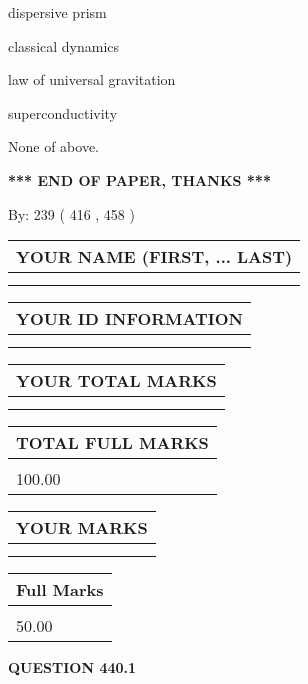 \documentclass[12pt]{article}
\begin{document}
 
dispersive prism
 
 
classical dynamics
 
 
law of universal gravitation
 
 
superconductivity
 
 
 None of above.
 
 
   
   
\vspace{1.0in} 
{\textbf{\large{ *** END OF PAPER, THANKS *** }}} 
   
   
\hspace{1.0in} By: 
 239 ( 416 ,  458 )
   
   
   
   
\newpage 
\setcounter{page}{ 
   440001 } 
   
   
   
   
\noindent\begin{tabular}{|l|}
\hline
YOUR NAME (FIRST, ... LAST)  \\
\hline
 \\ 
 \\ 
\hline
\end{tabular}
\hspace{0.05in} \begin{tabular}{|l|}
\hline
 YOUR   ID   INFORMATION  \\
\hline
 \\ 
 \\ 
\hline
\end{tabular}
   
   
\vspace{0.2in}\noindent\begin{tabular}{|l|}
\hline
YOUR TOTAL MARKS  \\
\hline
 \\ 
 \\ 
\hline
\end{tabular}
\hspace{0.05in} \begin{tabular}{|l|}
\hline
TOTAL FULL MARKS  \\
\hline
 \\ 
100.00 \\
\hline
\end{tabular}
  
\vspace{0.2in}
  
\noindent\begin{tabular}{|l|}
\hline
 YOUR MARKS  \\
\hline
 \\ 
 \\ 
\hline
\end{tabular}
\hspace{0.05in} \begin{tabular}{|l|}
\hline
 Full Marks  \\
\hline
 \\ 
50.00 \\
\hline
\end{tabular}
{\textbf{\Large{QUESTION
440.1 
}}}
  
\end{document}

